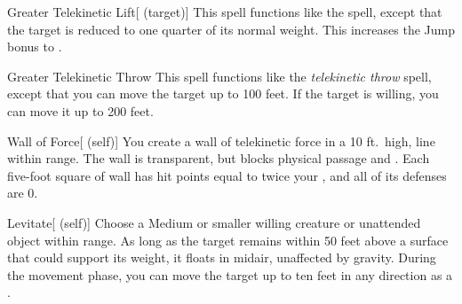 \lowercase{\hypertarget{spell:Greater Telekinetic Lift}{}}\label{spell:Greater Telekinetic Lift}
\begin{attuneability}[\nth{3}]{\hypertarget{spell:Greater Telekinetic Lift}{Greater Telekinetic Lift}}[ (target)]
This spell functions like the  spell, except that the target is reduced to one quarter of its normal weight.
This increases the Jump bonus to .
\end{attuneability}
\vspace{0.25em}



\lowercase{\hypertarget{spell:Greater Telekinetic Throw}{}}\label{spell:Greater Telekinetic Throw}
\begin{apability}[\nth{3}]{\hypertarget{spell:Greater Telekinetic Throw}{Greater Telekinetic Throw}}
This spell functions like the \textit{telekinetic throw} spell, except that you can move the target up to 100 feet.
If the target is willing, you can move it up to 200 feet.
\end{apability}
\vspace{0.25em}



\lowercase{\hypertarget{spell:Wall of Force}{}}\label{spell:Wall of Force}
\begin{attuneability}[\nth{3}]{\hypertarget{spell:Wall of Force}{Wall of Force}}[ (self)]
You create a wall of telekinetic force in a 10 ft.\ high, \arealarge line within \rngmed range.
The wall is transparent, but blocks physical passage and .
Each five-foot square of wall has hit points equal to twice your , and all of its defenses are 0.
\end{attuneability}
\vspace{0.25em}



\lowercase{\hypertarget{spell:Levitate}{}}\label{spell:Levitate}
\begin{attuneability}[\nth{4}]{\hypertarget{spell:Levitate}{Levitate}}[ (self)]
Choose a Medium or smaller willing creature or unattended object within \rngclose range.
As long as the target remains within 50 feet above a surface that could support its weight, it floats in midair, unaffected by gravity.
During the movement phase, you can move the target up to ten feet in any direction as a .
\end{attuneability}
\vspace{0.25em}



